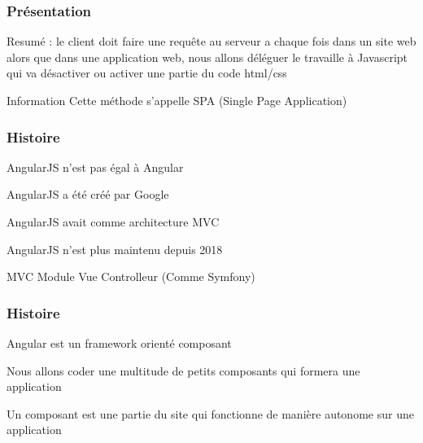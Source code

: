 \documentclass[10pt]{beamer}
\begin{document}
	\begin{frame}
		\frametitle{Présentation}

		Resumé :
		\newline \newline
		le client doit faire une requête au serveur a chaque fois dans un site web \newline \newline
		alors que dans une application web, nous allons déléguer le travaille à Javascript qui va désactiver ou activer une partie du code html/css
		\newline \newline
		\begin{block}{Information}
			Cette méthode s'appelle SPA (Single Page Application)
		\end{block}
	\end{frame}


	\begin{frame}
		\frametitle{Histoire}

		AngularJS n'est pas égal à Angular \newline \newline

		AngularJS a été créé par Google \newline \newline

		AngularJS avait comme architecture MVC \newline \newline

		AngularJS n'est plus maintenu depuis 2018 \newline \newline

		\begin{block}{MVC}
			Module Vue Controlleur (Comme Symfony)
		\end{block}

	\end{frame}

	\begin{frame}
		\frametitle{Histoire}

		Angular est un framework orienté composant \newline \newline

		Nous allons coder une multitude de petits composants qui formera une application \newline \newline

		Un composant est une partie du site qui fonctionne de manière autonome sur une application

	\end{frame}
\end{document}
